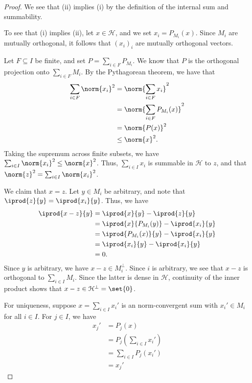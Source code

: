 \documentclass[10pt]{mypackage}
\begin{document}
\begin{proof}
  We see that (ii) implies (i) by the definition of the internal sum and summability.\newline

  To see that (i) implies (ii), let $x\in \mathcal{H}$, and we set $x_i = P_{M_i}\left(x\right)$. Since $M_i$ are mutually orthogonal, it follows that $\left(x_i\right)_i$ are mutually orthogonal vectors.\newline

  Let $F\subseteq I$ be finite, and set $P = \sum_{i\in F}P_{M_i}$. We know that $P$ is the orthogonal projection onto $\sum_{i\in F}M_{i}$. By the Pythagorean theorem, we have that
  \begin{align*}
    \sum_{i\in F}\norm{x_i}^2 &= \norm{\sum_{i\in F}x_i}^2\\
                              &= \norm{\sum_{i\in F}P_{M_i}(x)}^2\\
                              &= \norm{P(x)}^2\\
                              &\leq \norm{x}^2.
  \end{align*}
  Taking the supremum across finite subsets, we have $\sum_{i\in I}\norm{x_i}^2 \leq \norm{x}^2$. Thus, $\sum_{i\in I}x_i$ is summable in $\mathcal{H}$ to $z$, and that $\norm{z}^2 = \sum_{i\in I}\norm{x_i}^2$.\newline

  We claim that $x = z$. Let $y\in M_i$ be arbitrary, and note that $ \iprod{z}{y} = \iprod{x_i}{y} $. Thus, we have
  \begin{align*}
    \iprod{x-z}{y} &= \iprod{x}{y} - \iprod{z}{y} \\
                   &= \iprod{x}{P_{M_i}(y)} - \iprod{x_i}{y}\\
                   &= \iprod{P_{M_i}(x)}{y} - \iprod{x_i}{y}\\
                   &= \iprod{x_i}{y} - \iprod{x_i}{y}\\
                   &= 0.
  \end{align*}
  Since $y$ is arbitrary, we have $x - z\in M_i^{\perp}$. Since $i$ is arbitrary, we see that $x-z$ is orthogonal to $\sum_{i\in I}M_i$. Since the latter is dense in $\mathcal{H}$, continuity of the inner product shows that $x - z\in \mathcal{H}^{\perp} = \set{0}$.\newline

  For uniqueness, suppose $x = \sum_{i\in I}x_i'$ is an norm-convergent sum with $x_i'\in M_i$ for all $i\in I$. For $j\in I$, we have
  \begin{align*}
    x_j' &= P_j\left(x\right)\\
         &= P_j\left(\sum_{i\in I}x_i'\right)\\
                      &= \sum_{i\in I}P_j\left(x_i'\right)\\
                      &= x_j'
  \end{align*}
\end{proof}
\end{document}
